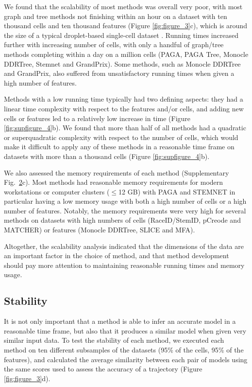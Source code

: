 We found that the scalability of most methods was overall very poor, with most graph and tree methods not finishing within an hour on a dataset with ten thousand cells and ten thousand features (Figure \ref{fig:figure_3}c), which is around the size of a typical droplet-based single-cell dataset \cite{svensson_exponentialscalingsinglecell_2018}. Running times increased further with increasing number of cells, with only a handful of graph/tree methods completing within a day on a million cells (PAGA, PAGA Tree, Monocle DDRTree, Stemnet and GrandPrix). Some methods, such as Monocle DDRTree and GrandPrix, also suffered from unsatisfactory running times when given a high number of features.

Methods with a low running time typically had two defining aspects: they had a linear time complexity with respect to the features and/or cells, and adding new cells or features led to a relatively low increase in time (Figure \ref{fig:supfigure_4}b). We found that more than half of all methods had a quadratic or superquadratic complexity with respect to the number of cells, which would make it difficult to apply any of these methods in a reasonable time frame on datasets with more than a thousand cells (Figure \ref{fig:supfigure_4}b).

We also assessed the memory requirements of each method (Supplementary Fig.~\href{https://github.com/dynverse/dynbenchmark_results/raw/master/08-summary/results_suppfig.pdf}{2}c). Most methods had reasonable memory requirements for modern workstations or computer clusters ($\leq$12 GB) with PAGA and STEMNET in particular having a low memory usage with both a high number of cells or a high number of features. Notably, the memory requirements were very high for several methods on datasets with high numbers of cells (RaceID/StemID, pCreode and MATCHER) or features (Monocle DDRTree, SLICE and MFA).

Altogether, the scalability analysis indicated that the dimensions of the data are an important factor in the choice of method, and that method development should pay more attention to maintaining reasonable running times and memory usage.

\subsection{Stability}

It is not only important that a method is able to infer an accurate model in a reasonable time frame, but also that it produces a similar model when given very similar input data. To test the stability of each method, we executed each method on ten different subsamples of the datasets (95$\%$ of the cells, 95$\%$ of the features), and calculated the average similarity between each pair of models using the same scores used to assess the accuracy of a trajectory (Figure \ref{fig:figure_3}d).

